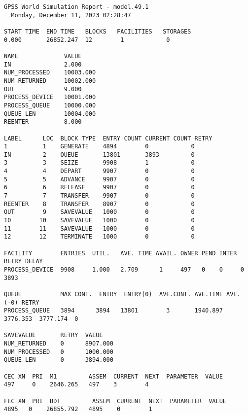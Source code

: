 \begin{lstlisting}[label=percent90,caption=Результат работы программы для процента возврата 90\%]
GPSS World Simulation Report - model.49.1
  Monday, December 11, 2023 02:28:47  

START TIME  END TIME   BLOCKS   FACILITIES   STORAGES
0.000       26852.247  12        1            0

NAME             VALUE  
IN               2.000
NUM_PROCESSED    10003.000
NUM_RETURNED     10002.000
OUT              9.000
PROCESS_DEVICE   10001.000
PROCESS_QUEUE    10000.000
QUEUE_LEN        10004.000
REENTER          8.000

LABEL      LOC  BLOCK TYPE  ENTRY COUNT CURRENT COUNT RETRY
1          1    GENERATE    4894        0            0
IN         2    QUEUE       13801       3893         0
3          3    SEIZE       9908        1            0
4          4    DEPART      9907        0            0
5          5    ADVANCE     9907        0            0
6          6    RELEASE     9907        0            0
7          7    TRANSFER    9907        0            0
REENTER    8    TRANSFER    8907        0            0
OUT        9    SAVEVALUE   1000        0            0
10        10    SAVEVALUE   1000        0            0
11        11    SAVEVALUE   1000        0            0
12        12    TERMINATE   1000        0            0

FACILITY        ENTRIES  UTIL.   AVE. TIME AVAIL. OWNER PEND INTER RETRY DELAY
PROCESS_DEVICE  9908     1.000   2.709      1     497   0    0     0      3893

QUEUE           MAX CONT.  ENTRY  ENTRY(0)  AVE.CONT. AVE.TIME AVE.(-0) RETRY
PROCESS_QUEUE   3894      3894   13801        3       1940.897 3776.353  3777.174  0

SAVEVALUE       RETRY  VALUE
NUM_RETURNED    0      8907.000                            
NUM_PROCESSED   0      1000.000                            
QUEUE_LEN       0      3894.000

CEC XN  PRI  M1         ASSEM  CURRENT  NEXT  PARAMETER  VALUE
497     0    2646.265   497    3        4

FEC XN  PRI  BDT         ASSEM  CURRENT  NEXT  PARAMETER  VALUE
4895   0    26855.792   4895    0        1	
\end{lstlisting}


